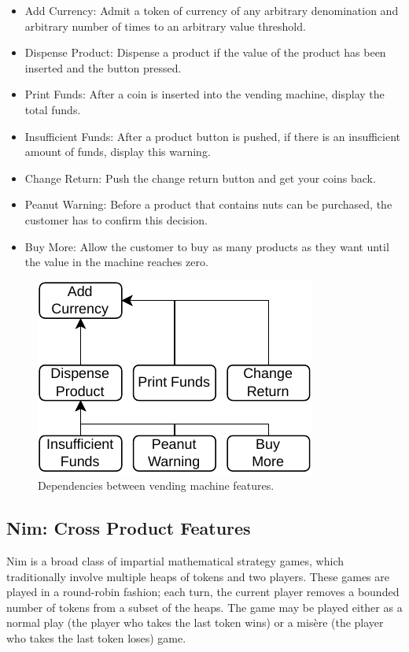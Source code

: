 \documentclass[sigplan,anonymous,review]{acmart}
\begin{document}
\begin{itemize}
    \item Add Currency: Admit a token of currency of any arbitrary denomination and arbitrary number of times to an arbitrary value threshold.
    \item Dispense Product: Dispense a product if the value of the product has been inserted and the button pressed.
    \item Print Funds: After a coin is inserted into the vending machine, display the total funds.
    \item Insufficient Funds: After a product button is pushed, if there is an insufficient amount of funds, display this warning.
    \item Change Return: Push the change return button and get your coins back.
    \item Peanut Warning: Before a product that contains nuts can be purchased, the customer has to confirm this decision.
    \item Buy More: Allow the customer to buy as many products as they want until the value in the machine reaches zero.
\end{itemize}

\begin{figure}
    \centering
    \includegraphics[width=0.7\linewidth]{figures/VendingMachine.pdf}
    \caption{Dependencies between vending machine features.}
    \label{fig:vmDependencies}
\end{figure}

\subsection{Nim: Cross Product Features}
Nim is a broad class of impartial mathematical strategy games, which traditionally involve multiple heaps of tokens and two players. These games are played in a round-robin fashion; each turn, the current player removes a bounded number of tokens from a subset of the heaps. The game may be played either as a normal play (the player who takes the last token wins) or a mis\`{e}re (the player who takes the last token loses) game. 
\end{document}
